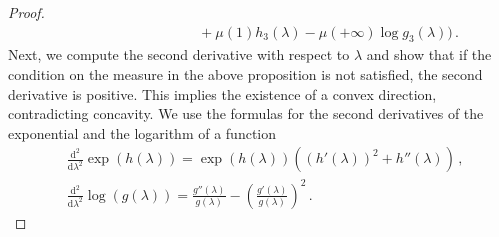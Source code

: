 \documentclass[aps,pra,11pt,onecolumn,nofootinbib,tightenlines]{revtex4-2}
\theoremstyle{definition}
\def \d {\mathrm{d}}
\begin{document}
\begin{proof}
\begin{align}
    &\quad \qquad \qquad \qquad \qquad +\mu( 1) h_3(\lambda) - \mu( +\infty) \log g_3(\lambda) \Bigg) \,.
\end{align}
Next, we compute the second derivative with respect to $\lambda$ and show that if the condition on the measure in the above proposition is not satisfied, the second derivative is positive. This implies the existence of a convex direction, contradicting concavity. We use the formulas for the second derivatives of the exponential and the logarithm of a function
\begin{align}
    &\frac{\d^2}{\d\lambda^2} \exp(h(\lambda)) = \exp(h(\lambda)) \left((h'(\lambda))^2+h''(\lambda)\right) \,, \\
&\frac{\d^2}{\d\lambda^2} \log(g(\lambda)) = \frac{g''(\lambda)}{g(\lambda)} - \left( \frac{g'(\lambda)}{g(\lambda)} \right)^2
\,.
\end{align}


\end{proof}
\end{document}
